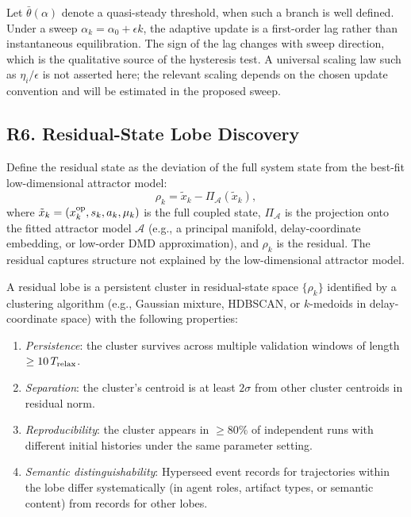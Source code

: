 \begin{justification}
Let $\bar\theta(\alpha)$ denote a quasi-steady threshold, when such a branch is
well defined.  Under a sweep $\alpha_k=\alpha_0+\epsilon k$, the adaptive update
is a first-order lag rather than instantaneous equilibration.  The sign of the
lag changes with sweep direction, which is the qualitative source of the
hysteresis test.  A universal scaling law such as $\eta_i/\epsilon$ is not
asserted here; the relevant scaling depends on the chosen update convention and
will be estimated in the proposed sweep.
\end{justification}

\subsection*{R6. Residual-State Lobe Discovery}

\begin{definition}
Define the residual state as the deviation of the full system state from the
best-fit low-dimensional attractor model:
\[
  \rho_k = \tilde x_k - \Pi_{\mathcal A}(\tilde x_k),
\]
where $\tilde x_k=(x_k^{\rm op},s_k,a_k,\mu_k)$ is the full coupled state,
$\Pi_{\mathcal A}$ is the projection onto the fitted attractor model
$\mathcal A$ (e.g., a principal manifold, delay-coordinate embedding, or
low-order DMD approximation), and $\rho_k$ is the residual.  The residual
captures structure not explained by the low-dimensional attractor model.
\end{definition}

\begin{definition}
A residual lobe is a persistent cluster in residual-state space
$\{\rho_k\}$ identified by a clustering algorithm (e.g., Gaussian mixture,
HDBSCAN, or $k$-medoids in delay-coordinate space) with the following
properties:
\begin{enumerate}
  \item \emph{Persistence}: the cluster survives across multiple validation
        windows of length $\ge 10\,T_{\rm relax}$.
  \item \emph{Separation}: the cluster's centroid is at least $2\sigma$ from
        other cluster centroids in residual norm.
  \item \emph{Reproducibility}: the cluster appears in $\ge 80\%$ of
        independent runs with different initial histories under the same
        parameter setting.
  \item \emph{Semantic distinguishability}: Hyperseed event records for
        trajectories within the lobe differ systematically (in agent roles,
        artifact types, or semantic content) from records for other lobes.
\end{enumerate}
\end{definition}

